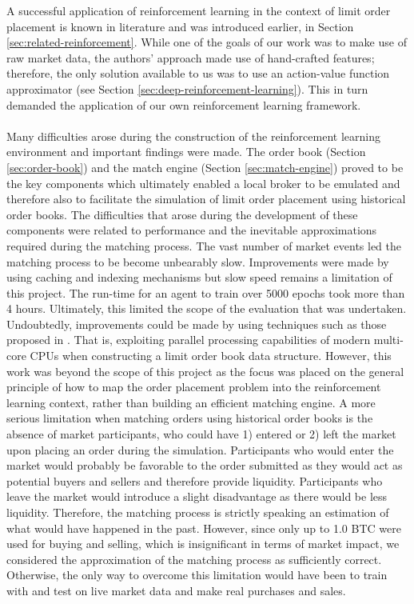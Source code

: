     A successful application of reinforcement learning in the context of limit order placement is known in literature\cite{nevmyvaka2006reinforcement} and was introduced earlier, in Section \ref{sec:related-reinforcement}.
    While one of the goals of our work was to make use of raw market data, the authors' approach made use of hand-crafted features;  therefore, the only solution available to us was to use an action-value function approximator (see Section \ref{sec:deep-reinforcement-learning}).
    This in turn demanded the application of our own reinforcement learning framework.
    \\
    \\
    Many difficulties arose during the construction of the reinforcement learning environment and important findings were made.
    The order book (Section \ref{sec:order-book}) and the match engine (Section \ref{sec:match-engine}) proved to be the key components which ultimately enabled a local broker to be emulated and therefore also to facilitate the simulation of limit order placement using historical order books.
    The difficulties that arose during the development of these components were related to performance and the inevitable approximations required during the matching process.
    The vast number of market events led the matching process to be become unbearably slow.
    Improvements were made by using caching and indexing mechanisms but slow speed remains a limitation of this project. The run-time for an agent to train over 5000 epochs took more than 4 hours.
    Ultimately, this limited the scope of the evaluation that was undertaken. 
    Undoubtedly, improvements could be made by using techniques such as those proposed in \cite{barazzutti2016exploiting}.
    That is, exploiting parallel processing capabilities of modern multi-core CPUs when constructing a limit order book data structure.
    However, this work was beyond the scope of this project as the focus was placed on the general principle of how to map the order placement problem into the reinforcement learning context, rather than building an efficient matching engine.
    A more serious limitation when matching orders using historical order books is the absence of market participants, who could have 1) entered or 2) left the market upon placing an order during the simulation.
    Participants who would enter the market would probably be favorable to the order submitted as they would act as potential buyers and sellers and therefore provide liquidity.
    Participants who leave the market would introduce a slight disadvantage as there would be less liquidity.
    Therefore, the matching process is strictly speaking an estimation of what would have happened in the past.
    However, since only up to 1.0 BTC were used for buying and selling, which is insignificant in terms of market impact\cite{hautsch2012market}, we considered the approximation of the matching process as sufficiently correct.
    Otherwise, the only way to overcome this limitation would have been to train with and test on live market data and make real purchases and sales.
    
